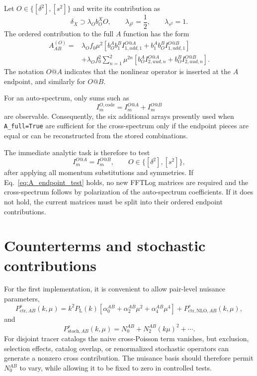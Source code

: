 \documentclass[11pt,a4paper]{article}
\newcommand{\PL}{P_{\mathrm{L}}}
\begin{document}
Let $O\in\{[\delta^2],[s^2]\}$ and write its contribution as
\begin{equation}
    \delta_X\supset\lambda_O b_O^X O,
    \qquad
    \lambda_{\delta^2}=\frac12,
    \qquad
    \lambda_{s^2}=1.
\end{equation}
The ordered contribution to the full $A$ function has the form
\begin{align}
    A_{AB}^{(O)}
    ={}&
    \lambda_O f_0\mu^2
    \left[
        b_O^A b_1^B I_{1,udd,1}^{O@A}
        +b_1^A b_O^B I_{1,udd,1}^{O@B}
    \right]
    \nonumber\\
    &+\lambda_O f_0^2
    \sum_{n=1}^{2}\mu^{2n}
    \left[
        b_O^A I_{2,uud,n}^{O@A}
        +b_O^B I_{2,uud,n}^{O@B}
    \right].
\label{eq:A_cross_operator_ordered}
\end{align}
The notation $O@A$ indicates that the nonlinear operator is inserted at the $A$ endpoint, and similarly for $O@B$.

For an auto-spectrum, only sums such as
\begin{equation}
    I_m^{O,\mathrm{code}}=I_m^{O@A}+I_m^{O@B}
\end{equation}
are observable. Consequently, the six additional arrays presently used when \texttt{A\_full=True} are sufficient for the cross-spectrum only if the endpoint pieces are equal or can be reconstructed from the stored combinations.

The immediate analytic task is therefore to test
\begin{equation}
    I_m^{O@A}=I_m^{O@B},
    \qquad O\in\{[\delta^2],[s^2]\},
\label{eq:A_endpoint_test}
\end{equation}
after applying all momentum substitutions and symmetries. If Eq.~\eqref{eq:A_endpoint_test} holds, no new FFTLog matrices are required and the cross-spectrum follows by polarization of the auto-spectrum coefficients. If it does not hold, the current matrices must be split into their ordered endpoint contributions.

\section{Counterterms and stochastic contributions}
\label{sec:nuisance}

For the first implementation, it is convenient to allow pair-level nuisance parameters,
\begin{equation}
    P_{\mathrm{ctr},AB}^s(k,\mu)
    =k^2\PL(k)
    \left[
        \alpha_0^{AB}
        +\alpha_2^{AB}\mu^2
        +\alpha_4^{AB}\mu^4
    \right]
    +P_{\mathrm{ctr,NLO},AB}^s(k,\mu),
\end{equation}
and
\begin{equation}
    P_{\mathrm{stoch},AB}^s(k,\mu)
    =N_0^{AB}+N_2^{AB}(k\mu)^2+\cdots .
\end{equation}
For disjoint tracer catalogs the naive cross-Poisson term vanishes, but exclusion, selection effects, catalog overlap, or renormalized stochastic operators can generate a nonzero cross contribution. The nuisance basis should therefore permit $N_0^{AB}$ to vary, while allowing it to be fixed to zero in controlled tests.
\end{document}
